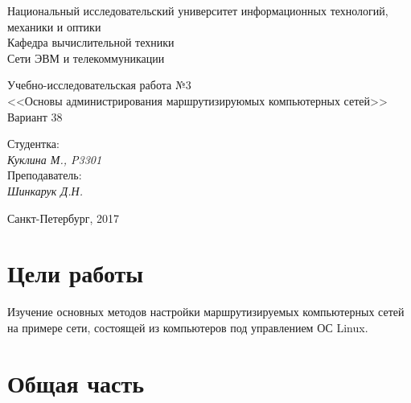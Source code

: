 \documentclass[11pt, a4paper] {ncc}
\begin{document}
\setcounter{figure}{0}
\frenchspacing
\pagestyle{empty}
\begin{center}
     Национальный исследовательский университет информационных технологий,
                              механики и оптики\\
                        Кафедра вычислительной техники\\
                          Сети ЭВМ и телекоммуникации
\end{center}
\begin{center}
                            Учебно-исследовательская работа №3\\
                        <<Основы администрирования маршрутизируюмых компьютерных сетей>>\\
                                Вариант 38
\end{center}
\begin{flushright}
                                          Студентка:\\
                                                         {\it Куклина М., P3301} \\
                                          Преподаватель:\\
                                                         {\it Шинкарук Д.Н. }
\end{flushright}
\begin{center}
                             Санкт-Петербург, 2017
\end{center}
\newpage


\section*{Цели работы}
    Изучение основных методов настройки маршрутизируемых компьютерных сетей на примере сети,
    состоящей из компьютеров под управлением ОС Linux.

\section*{Общая часть}
\end{document}
